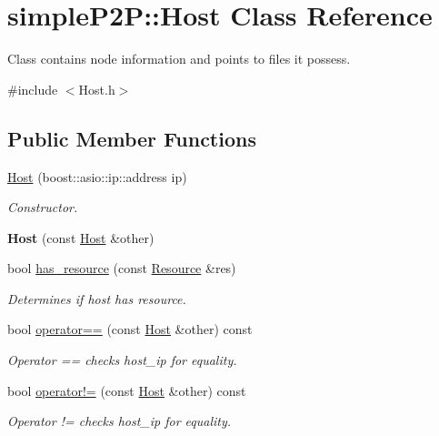 \hypertarget{classsimpleP2P_1_1Host}{}\section{simple\+P2P\+:\+:Host Class Reference}
\label{classsimpleP2P_1_1Host}


Class contains node information and points to files it possess.  




{\ttfamily \#include $<$Host.\+h$>$}

\subsection*{Public Member Functions}
\begin{DoxyCompactItemize}
\item 
\hyperlink{classsimpleP2P_1_1Host_abbe0b5c51195b8cf2019d791ace5a5c7}{Host} (boost\+::asio\+::ip\+::address ip)
\begin{DoxyCompactList}\small\item\em Constructor. \end{DoxyCompactList}\item 
\mbox{\label{classsimpleP2P_1_1Host_aa09ad4eaba6dce6de7d46e66808a60aa}} 
{\bfseries Host} (const \hyperlink{classsimpleP2P_1_1Host}{Host} \&other)
\item 
bool \hyperlink{classsimpleP2P_1_1Host_a242f1e472007f5b52bfdfbe74a47009f}{has\+\_\+resource} (const \hyperlink{classsimpleP2P_1_1Resource}{Resource} \&res)
\begin{DoxyCompactList}\small\item\em Determines if host has resource. \end{DoxyCompactList}\item 
bool \hyperlink{classsimpleP2P_1_1Host_aadac09c6ab516f62e5eebe28dd584626}{operator==} (const \hyperlink{classsimpleP2P_1_1Host}{Host} \&other) const
\begin{DoxyCompactList}\small\item\em Operator == checks host\+\_\+ip for equality. \end{DoxyCompactList}\item 
bool \hyperlink{classsimpleP2P_1_1Host_a13516e95bf59bb8dd6eea8940f8bb677}{operator!=} (const \hyperlink{classsimpleP2P_1_1Host}{Host} \&other) const
\begin{DoxyCompactList}\small\item\em Operator != checks host\+\_\+ip for equality. \end{DoxyCompactList}\item 

\end{DoxyCompactItemize}
